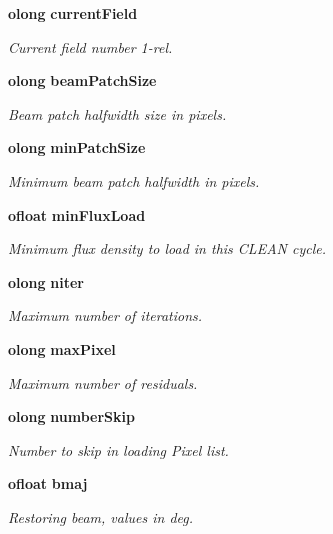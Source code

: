 \begin{CompactItemize}
{\bf olong} {\bf current\-Field}
\begin{CompactList}\small\item\em Current field number 1-rel. \item\end{CompactList}\item 
{\bf olong} {\bf beam\-Patch\-Size}
\begin{CompactList}\small\item\em Beam patch halfwidth size in pixels. \item\end{CompactList}\item 
{\bf olong} {\bf min\-Patch\-Size}
\begin{CompactList}\small\item\em Minimum beam patch halfwidth in pixels. \item\end{CompactList}\item 
{\bf ofloat} {\bf min\-Flux\-Load}
\begin{CompactList}\small\item\em Minimum flux density to load in this CLEAN cycle. \item\end{CompactList}\item 
{\bf olong} {\bf niter}
\begin{CompactList}\small\item\em Maximum number of iterations. \item\end{CompactList}\item 
{\bf olong} {\bf max\-Pixel}
\begin{CompactList}\small\item\em Maximum number of residuals. \item\end{CompactList}\item 
{\bf olong} {\bf number\-Skip}
\begin{CompactList}\small\item\em Number to skip in loading Pixel list. \item\end{CompactList}\item 
{\bf ofloat} {\bf bmaj}
\begin{CompactList}\small\item\em Restoring beam, values in deg. \item\end{CompactList}\item 

\end{CompactItemize}
